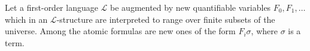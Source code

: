 Let a first-order language $\mathcal{L}$ be augmented by new quantifiable variables $F_0, F_1, \ldots$ which in an $\mathcal{L}$-structure are interpreted to range over finite subsets of the universe. Among the atomic formulas are new ones of the form $F_i\sigma$, where $\sigma$ is a term.
